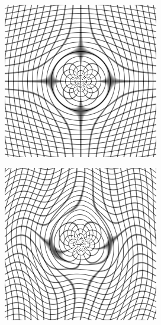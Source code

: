 \begin{figure}[H]
\begin{subfigure}[t]{0.3\textwidth}
	  \label{fig:gridSin}
	\end{subfigure} \\
	\begin{subfigure}[t]{0.3\textwidth}
	  \includegraphics[width=\textwidth]{figuras/gridDist.png}
	  \label{fig:gridDist}
	\end{subfigure}
	\begin{subfigure}[t]{0.3\textwidth}
	  \includegraphics[width=\textwidth]{figuras/movingImageDistSin.png}

\end{subfigure}
\end{figure}
